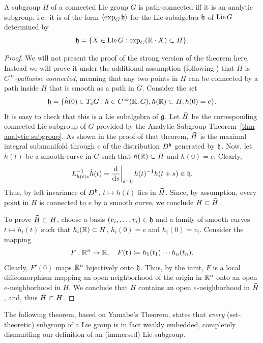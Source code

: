 \begin{thm}\label{thm Yamabe}
    A subgroup $H$ of a connected Lie group $G$ is path-connected iff it is an analytic subgroup, i.e.~it is of the form $\langle\exp_G\mathfrak{h}\rangle$ for the Lie subalgebra $\mathfrak{h}$ of $\operatorname{Lie} G$ determined by
    \[\mathfrak{h}=\{X\in\operatorname{Lie} G: \exp_G(\mathbb{R}\cdot X)\subset H\}.\]
\end{thm}
\begin{proof}
    We will not present the proof of the strong version of the theorem here. Instead we will prove it under the additional assumption (following \cite[Lem.~1.7.10]{RS2}) that $H$ is \emph{$C^\infty$-pathwise connected}, meaning that any two points in $H$ can be connected by a path inside $H$ that is smooth as a path in $G$. Consider the set
    \[\mathfrak{h}=\{\dot h(0)\in T_eG: h\in C^\infty(\mathbb{R},G),h(\mathbb{R})\subset H,h(0)=e\}.\]
    It is easy to check that this is a Lie subalgebra of $\mathfrak{g}$. Let $\wt H$ be the corresponding connected Lie subgroup of $G$ provided by the Analytic Subgroup Theorem~\ref{thm analytic subgroup}. As shown in the proof of that theorem, $\wt H$ is the maximal integral submanifold through $e$ of the distribution $D^{\mathfrak{h}}$ generated by $\mathfrak{h}$. Now, let $h(t)$ be a smooth curve in $G$ such that $h(\mathbb{R})\subset H$ and $h(0)=e$. Clearly,
    \[L_{h(t)\ast}^{-1}\dot h(t)=\restr{\frac{\dd}{\dd s}}{s=0}h(t)^{-1}h(t+s)\in\frakh.\]
    Thus, by left invariance of $D^{\mathfrak{h}}$, $t\mapsto h(t)$ lies in $\wt H$. Since, by assumption, every point in $H$ is connected to $e$ by a smooth curve, we conclude $H\subset \wt H$.

    To prove $\wt H\subset H$, choose a basis $(v_i,\ldots,v_i)\in \mathfrak{h}$ and a family of smooth curves $t\mapsto h_i(t)$ such that $h_i(\mathbb{R})\subset H$, $h_i(0)=e$ and $\dot h_i(0)=v_i$. Consider the mapping
    \[F:\mathbb{R}^n\to \mathbb{R},\quad F(\mathbf{t})\coloneqq h_1(t_1)\cdots h_n(t_n).\]
    Clearly, $F'(0)$ maps $\mathbb{R}^n$ bijectively onto $\mathfrak{h}$. Thus, by the \gls{inmt}, $F$ is a local diffeomorphism mapping an open neighborhood of the origin in $\mathbb{R}^n$ onto an open $e$-neighborhood in $H$. We conclude that $H$ contains an open $e$-neighborhood in $\wt H$, and, thus $\wt H\subset H$.
\end{proof}

The following theorem, based on Yamabe's Theorem, states that \emph{every} (set-theoretic) subgroup of a Lie group is in fact weakly embedded, completely dismantling our definition of an (immersed) Lie subgroup.

